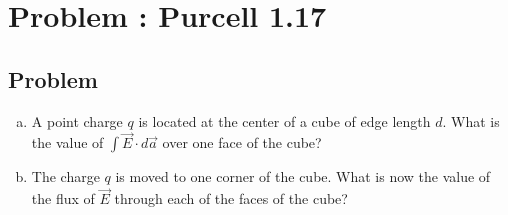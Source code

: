 \documentclass[solutions]{esg8022pset}
\begin{document}
\section{Problem \thesection: Purcell 1.17}
\subsection{Problem}
  \begin{enumerate}[(a)]
    \item A point charge $q$ is located at the center of a cube of edge length $d$. What is the value of $\int \vec E \cdot d\vec a$ over one face of the cube?
    \item The charge $q$ is moved to one corner of the cube. What is now the value of the flux of $\vec E$ through each of the faces of the cube?
  \end{enumerate}
\end{document}
